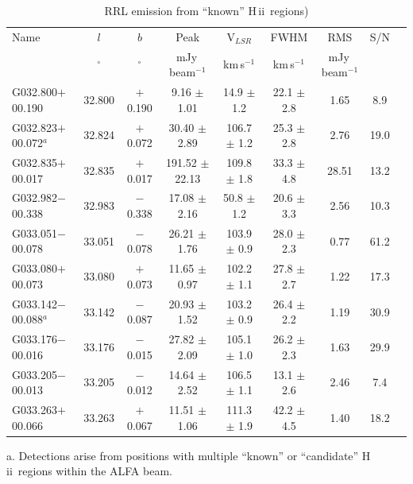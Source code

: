 \documentclass[manuscript]{aastex61}
\newcommand{\hii}{{\rm H\,}{{\sc ii}}}
\begin{document}
\begin{table}[htbp]
\centering
\caption{RRL emission from ``known'' \hii\ regions)}\label{tab_hii_k_sample}
\begin{threeparttable}
\begin{tabular*}{\textwidth}{l@{\extracolsep{\fill}}*{8}{c}}
\hline
\hline
Name & $l$ & $b$ & Peak& V$_{LSR}$& FWHM& RMS& S/N\\
&$^\circ$&$^\circ$&mJy\,beam$^{-1}$&km\,s$^{-1}$&km\,s$^{-1}$&mJy\,beam$^{-1}$& \\
\hline
G032.800$+$00.190     &32.800&	$+$0.190	&9.16	$\pm$ 1.01	&14.9	$\pm$ 1.2	&22.1	$\pm$ 2.8	&1.65	&8.9 \\ 
G032.823$+$00.072$^a$ &32.824&	$+$0.072	&30.40	$\pm$ 2.89	&106.7	$\pm$ 1.2	&25.3	$\pm$ 2.8	&2.76	&19.0\\
G032.835$+$00.017     &32.835&	$+$0.017	&191.52	$\pm$ 22.13	&109.8	$\pm$ 1.8	&33.3	$\pm$ 4.8	&28.51	&13.2\\
G032.982$-$00.338     &32.983&	$-$0.338	&17.08	$\pm$ 2.16	&50.8	$\pm$ 1.2	&20.6	$\pm$ 3.3	&2.56	&10.3\\
G033.051$-$00.078     &33.051&	$-$0.078	&26.21	$\pm$ 1.76	&103.9	$\pm$ 0.9	&28.0	$\pm$ 2.3	&0.77	&61.2\\
G033.080$+$00.073     &33.080&	$+$0.073	&11.65	$\pm$ 0.97	&102.2	$\pm$ 1.1	&27.8	$\pm$ 2.7	&1.22	&17.3\\
G033.142$-$00.088$^a$ &33.142&	$-$0.087	&20.93	$\pm$ 1.52	&103.2	$\pm$ 0.9	&26.4	$\pm$ 2.2	&1.19	&30.9\\
G033.176$-$00.016     &33.176&	$-$0.015	&27.82	$\pm$ 2.09	&105.1	$\pm$ 1.0	&26.2	$\pm$ 2.3	&1.63	&29.9\\
G033.205$-$00.013     &33.205&	$-$0.012	&14.64	$\pm$ 2.52	&106.5	$\pm$ 1.1	&13.1	$\pm$ 2.6	&2.46	&7.4\\
G033.263$+$00.066     &33.263&	$+$0.067	&11.51	$\pm$ 1.06	&111.3	$\pm$ 1.9	&42.2	$\pm$ 4.5	&1.40	&18.2\\
\hline
\end{tabular*}
\begin{tablenotes}
      \small
      \item a. Detections arise from positions with multiple ``known'' or ``candidate'' \hii\ regions within the ALFA beam.
\end{tablenotes}
\end{threeparttable}
\end{table}
\end{document}
